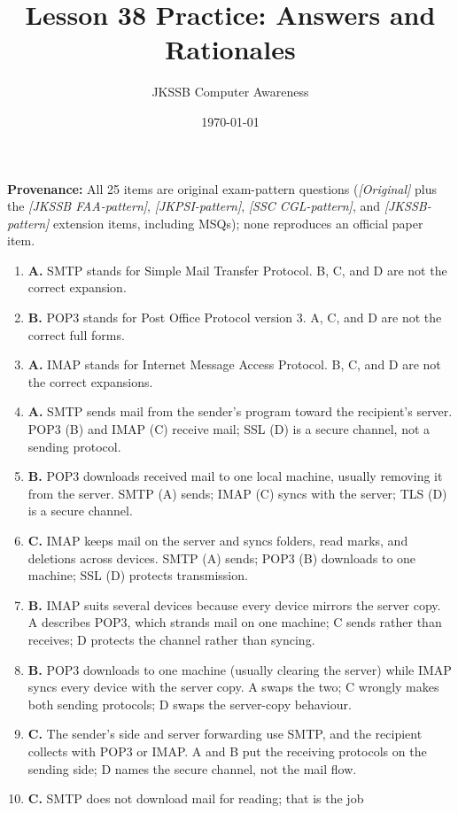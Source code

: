 \documentclass[11pt]{article}
\title{Lesson 38 Practice: Answers and Rationales}
\author{JKSSB Computer Awareness}
\date{\today}
\begin{document}
\maketitle
\noindent\textbf{Provenance:} All 25 items are original exam-pattern questions (\textit{[Original]} plus the \textit{[JKSSB FAA-pattern]}, \textit{[JKPSI-pattern]}, \textit{[SSC CGL-pattern]}, and \textit{[JKSSB-pattern]} extension items, including MSQs); none reproduces an official paper item.
\begin{enumerate}[label=\textbf{Q\arabic*.}, leftmargin=*]
\item \textbf{A.} SMTP stands for Simple Mail Transfer Protocol. B, C, and D
  are not the correct expansion.
\item \textbf{B.} POP3 stands for Post Office Protocol version 3. A, C, and
  D are not the correct full forms.
\item \textbf{A.} IMAP stands for Internet Message Access Protocol. B, C,
  and D are not the correct expansions.
\item \textbf{A.} SMTP sends mail from the sender's program toward the
  recipient's server. POP3 (B) and IMAP (C) receive mail; SSL (D) is a secure
  channel, not a sending protocol.
\item \textbf{B.} POP3 downloads received mail to one local machine, usually
  removing it from the server. SMTP (A) sends; IMAP (C) syncs with the
  server; TLS (D) is a secure channel.
\item \textbf{C.} IMAP keeps mail on the server and syncs folders, read
  marks, and deletions across devices. SMTP (A) sends; POP3 (B) downloads to
  one machine; SSL (D) protects transmission.
\item \textbf{B.} IMAP suits several devices because every device mirrors
  the server copy. A describes POP3, which strands mail on one machine; C
  sends rather than receives; D protects the channel rather than syncing.
\item \textbf{B.} POP3 downloads to one machine (usually clearing the
  server) while IMAP syncs every device with the server copy. A swaps the
  two; C wrongly makes both sending protocols; D swaps the server-copy
  behaviour.
\item \textbf{C.} The sender's side and server forwarding use SMTP, and the
  recipient collects with POP3 or IMAP. A and B put the receiving protocols
  on the sending side; D names the secure channel, not the mail flow.
\item \textbf{C.} SMTP does not download mail for reading; that is the job

\end{enumerate}
\end{document}
